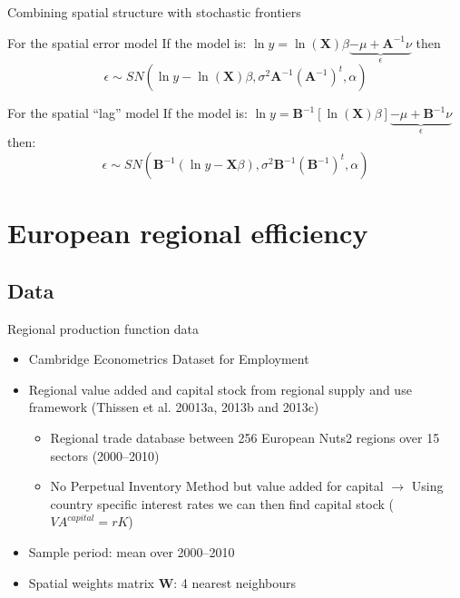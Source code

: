 \documentclass[presentation]{beamer}
\begin{document}
\begin{frame}{Combining spatial structure with stochastic frontiers}

\begin{block}{For the spatial error model}
	If the model is: $\ln y = \ln(\mathbf{X}) \beta \underbrace{- \mu +  \mathbf{A}^{-1}\nu}_\epsilon$ then
	\begin{equation*}
	\epsilon  \sim SN(\ln y - \ln(\mathbf{X}) \beta, \sigma^2 \mathbf{A}^{-1} (\mathbf{A}^{-1})^t, \alpha)
	\end{equation*}
\end{block}

\begin{block}{For the spatial ``lag'' model}
	If the model is: $\ln y =  \mathbf{B}^{-1}\left[\ln(\mathbf{X}) \beta\right] \underbrace{ - \mu+ \mathbf{B}^{-1}\nu}_{\epsilon}$ then:
	\begin{equation*}
		\epsilon \sim  SN(\mathbf{B}^{-1}(\ln y - \mathbf{X}\beta), \sigma^2 \mathbf{B}^{-1}(\mathbf{B}^{-1})^t, \alpha)
	\end{equation*}
\end{block}


\end{frame}

\section{European regional efficiency}

\subsection{Data}

\begin{frame}{Regional production function data}
\begin{itemize}
	\item Cambridge Econometrics Dataset for Employment
	\item Regional value added and capital stock from regional supply and use framework (Thissen et al. 20013a, 2013b and 2013c)
	\begin{itemize}
		\item Regional trade database between 256 European Nuts2 regions over 15 sectors (2000--2010)
		\item No Perpetual Inventory Method but value added for capital $\rightarrow$ Using country specific interest rates we can then find capital stock ($VA^{capital} = rK$)
	\end{itemize}
	\item Sample period: mean over 2000--2010
	\item Spatial weights matrix $\mathbf{W}$: 4 nearest neighbours
\end{itemize}
\end{frame}
\end{document}
